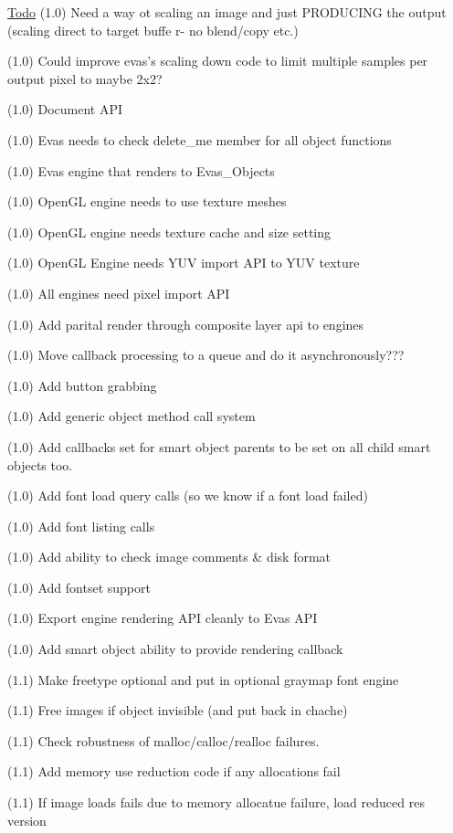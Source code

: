 \begin{Desc}
\item[\hyperlink{todo__todo000001}{Todo}](1.0) Need a way ot scaling an image and just PRODUCING the output (scaling direct to target buffe r-\/ no blend/copy etc.) 

(1.0) Could improve evas's scaling down code to limit multiple samples per output pixel to maybe 2x2? 

(1.0) Document API 

(1.0) Evas needs to check delete\_\-me member for all object functions 

(1.0) Evas engine that renders to Evas\_\-Objects 

(1.0) OpenGL engine needs to use texture meshes 

(1.0) OpenGL engine needs texture cache and size setting 

(1.0) OpenGL Engine needs YUV import API to YUV texture 

(1.0) All engines need pixel import API 

(1.0) Add parital render through composite layer api to engines 

(1.0) Move callback processing to a queue and do it asynchronously??? 

(1.0) Add button grabbing 

(1.0) Add generic object method call system 

(1.0) Add callbacks set for smart object parents to be set on all child smart objects too. 

(1.0) Add font load query calls (so we know if a font load failed) 

(1.0) Add font listing calls 

(1.0) Add ability to check image comments \& disk format 

(1.0) Add fontset support 

(1.0) Export engine rendering API cleanly to Evas API 

(1.0) Add smart object ability to provide rendering callback 

(1.1) Make freetype optional and put in optional graymap font engine 

(1.1) Free images if object invisible (and put back in chache) 

(1.1) Check robustness of malloc/calloc/realloc failures. 

(1.1) Add memory use reduction code if any allocations fail 

(1.1) If image loads fails due to memory allocatue failure, load reduced res version 


\end{Desc}
